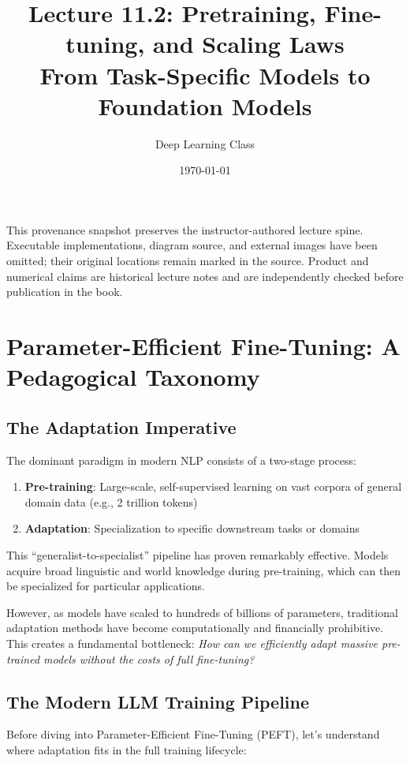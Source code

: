 \documentclass{article}
\title{Lecture 11.2: Pretraining, Fine-tuning, and Scaling Laws\\
From Task-Specific Models to Foundation Models}
\author{Deep Learning Class}
\date{\today}
\begin{document}
\maketitle
\begin{tcolorbox}[colback=gray!5!white, colframe=gray!60!black, title=Public Snapshot Boundary]
This provenance snapshot preserves the instructor-authored lecture spine. Executable
implementations, diagram source, and external images have been omitted; their original
locations remain marked in the source. Product and numerical claims are historical
lecture notes and are independently checked before publication in the book.
\end{tcolorbox}
\section{Parameter-Efficient Fine-Tuning: A Pedagogical Taxonomy}

\subsection{The Adaptation Imperative}

The dominant paradigm in modern NLP consists of a two-stage process:

\begin{enumerate}
\item \textbf{Pre-training}: Large-scale, self-supervised learning on vast corpora of general domain data (e.g., 2 trillion tokens)
\item \textbf{Adaptation}: Specialization to specific downstream tasks or domains
\end{enumerate}

This ``generalist-to-specialist'' pipeline has proven remarkably effective. Models acquire broad linguistic and world knowledge during pre-training, which can then be specialized for particular applications.

However, as models have scaled to hundreds of billions of parameters, traditional adaptation methods have become computationally and financially prohibitive. This creates a fundamental bottleneck: \textit{How can we efficiently adapt massive pre-trained models without the costs of full fine-tuning?}

\subsection{The Modern LLM Training Pipeline}

Before diving into Parameter-Efficient Fine-Tuning (PEFT), let's understand where adaptation fits in the full training lifecycle:
\end{document}

